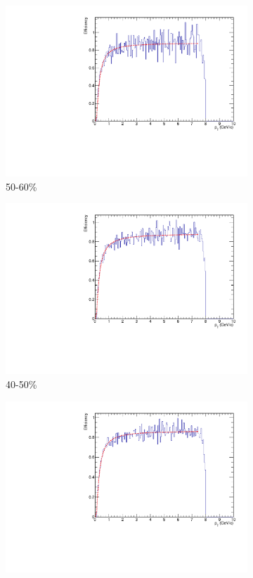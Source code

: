 \begin{figure}[htbp]
	\begin{subfigure}{0.5\textwidth}
		\includegraphics[width=.9\textwidth]{Plots/Correlations/hadron_efficiency/hadron_efficiency_centbin_2.pdf}
		\caption{50-60\%}
		\label{fig:assoheffa}
	\end{subfigure}	
	\begin{subfigure}{0.5\textwidth}
		\includegraphics[width=.9\textwidth]{Plots/Correlations/hadron_efficiency/hadron_efficiency_centbin_3.pdf}
		\caption{40-50\%}
		\label{fig:assoheffb}
	\end{subfigure}	
	\begin{subfigure}{0.5\textwidth}
		\includegraphics[width=.9\textwidth]{Plots/Correlations/hadron_efficiency/hadron_efficiency_centbin_4.pdf}

\end{subfigure}
\end{figure}

